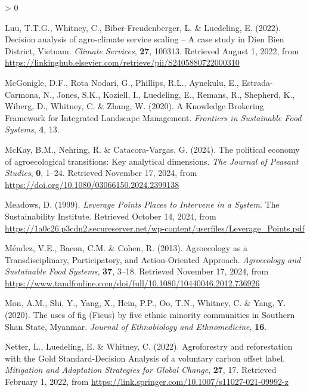 \documentclass[
]{article}
\newlength{\cslhangindent}
\newenvironment{CSLReferences}[2] %
 {%
  \setlength{\parindent}{0pt}
  \ifodd #1 \everypar{\setlength{\hangindent}{\cslhangindent}}\ignorespaces\fi
  \ifnum #2 > 0
  \setlength{\parskip}{#2\baselineskip}
  \fi
 }%
 {}
\begin{document}
\begin{CSLReferences}{1}{0}
\leavevmode{}%
Luu, T.T.G., Whitney, C., Biber-Freudenberger, L. \& Luedeling, E.
(2022). Decision analysis of agro-climate service scaling -- {A} case
study in {Dien} {Bien} {District}, {Vietnam}. \emph{Climate Services},
\textbf{27}, 100313. Retrieved August 1, 2022, from
\url{https://linkinghub.elsevier.com/retrieve/pii/S2405880722000310}

\leavevmode{}%
McGonigle, D.F., Rota Nodari, G., Phillips, R.L., Aynekulu, E.,
Estrada-Carmona, N., Jones, S.K., Koziell, I., Luedeling, E., Remans,
R., Shepherd, K., Wiberg, D., Whitney, C. \& Zhang, W. (2020). A
{Knowledge} {Brokering} {Framework} for {Integrated} {Landscape}
{Management}. \emph{Frontiers in Sustainable Food Systems}, \textbf{4},
13.

\leavevmode{}%
McKay, B.M., Nehring, R. \& Catacora-Vargas, G. (2024). The political
economy of agroecological transitions: Key analytical dimensions.
\emph{The Journal of Peasant Studies}, \textbf{0}, 1--24. Retrieved
November 17, 2024, from
\url{https://doi.org/10.1080/03066150.2024.2399138}

\leavevmode{}%
Meadows, D. (1999). \emph{Leverage {Points} {Places} to {Intervene} in a
{System}}. The Sustainability Institute. Retrieved October 14, 2024,
from
\url{https://1a0c26.p3cdn2.secureserver.net/wp-content/userfiles/Leverage_Points.pdf}

\leavevmode{}%
Méndez, V.E., Bacon, C.M. \& Cohen, R. (2013). Agroecology as a
{Transdisciplinary}, {Participatory}, and {Action}-{Oriented}
{Approach}. \emph{Agroecology and Sustainable Food Systems},
\textbf{37}, 3--18. Retrieved November 17, 2024, from
\url{https://www.tandfonline.com/doi/full/10.1080/10440046.2012.736926}

\leavevmode{}%
Mon, A.M., Shi, Y., Yang, X., Hein, P.P., Oo, T.N., Whitney, C. \& Yang,
Y. (2020). The uses of fig ({Ficus}) by five ethnic minority communities
in {Southern} {Shan} {State}, {Myanmar}. \emph{Journal of Ethnobiology
and Ethnomedicine}, \textbf{16}.

\leavevmode{}%
Netter, L., Luedeling, E. \& Whitney, C. (2022). Agroforestry and
reforestation with the {Gold} {Standard}-{Decision} {Analysis} of a
voluntary carbon offset label. \emph{Mitigation and Adaptation
Strategies for Global Change}, \textbf{27}, 17. Retrieved February 1,
2022, from \url{https://link.springer.com/10.1007/s11027-021-09992-z}


\end{CSLReferences}
\end{document}
